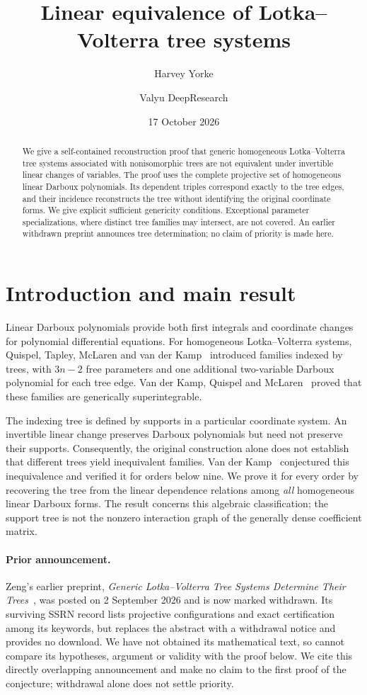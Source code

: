 \documentclass{amsart}
\title{Linear equivalence of Lotka--Volterra tree systems}
\author{Harvey Yorke}
\author{Valyu DeepResearch}
\date{17 October 2026}
\theoremstyle{remark}
\numberwithin{equation}{section}
\begin{document}
\begin{abstract}
We give a self-contained reconstruction proof that generic homogeneous Lotka--Volterra tree systems associated with nonisomorphic trees are not equivalent under invertible linear changes of variables. The proof uses the complete projective set of homogeneous linear Darboux polynomials. Its dependent triples correspond exactly to the tree edges, and their incidence reconstructs the tree without identifying the original coordinate forms. We give explicit sufficient genericity conditions. Exceptional parameter specializations, where distinct tree families may intersect, are not covered. An earlier withdrawn preprint announces tree determination; no claim of priority is made here.
\end{abstract}
\maketitle

\section{Introduction and main result}
Linear Darboux polynomials provide both first integrals and coordinate changes for polynomial differential equations. For homogeneous Lotka--Volterra systems, Quispel, Tapley, McLaren and van der Kamp~\cite{construction} introduced families indexed by trees, with $3n-2$ free parameters and one additional two-variable Darboux polynomial for each tree edge. Van der Kamp, Quispel and McLaren~\cite{trees} proved that these families are generically superintegrable.

The indexing tree is defined by supports in a particular coordinate system. An invertible linear change preserves Darboux polynomials but need not preserve their supports. Consequently, the original construction alone does not establish that different trees yield inequivalent families. Van der Kamp~\cite[Conjecture~12]{hypergraphs} conjectured this inequivalence and verified it for orders below nine. We prove it for every order by recovering the tree from the linear dependence relations among \emph{all} homogeneous linear Darboux forms. The result concerns this algebraic classification; the support tree is not the nonzero interaction graph of the generally dense coefficient matrix.

\paragraph{Prior announcement.}
Zeng's earlier preprint, \emph{Generic Lotka--Volterra Tree Systems Determine Their Trees}~\cite{zeng}, was posted on 2 September 2026 and is now marked withdrawn. Its surviving SSRN record lists projective configurations and exact certification among its keywords, but replaces the abstract with a withdrawal notice and provides no download. We have not obtained its mathematical text, so cannot compare its hypotheses, argument or validity with the proof below. We cite this directly overlapping announcement and make no claim to the first proof of the conjecture; withdrawal alone does not settle priority.
\end{document}

